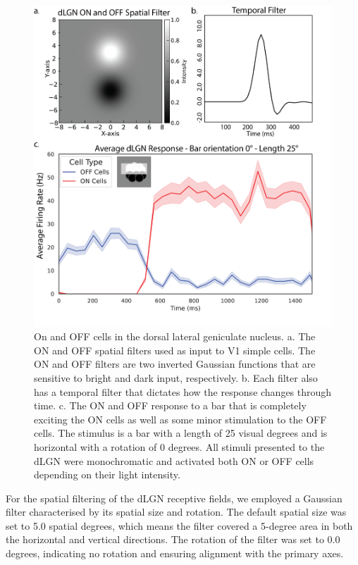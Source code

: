 \documentclass[12pt]{article}
\begin{document}
\begin{figure}[H]
  \centering
  \includegraphics[width=1.0 \textwidth]{adjusted_figures/lgn_response_fig.png}
  \caption{On and OFF cells in the dorsal lateral geniculate nucleus. a. The ON and OFF spatial filters used as input to V1 simple cells. The ON and OFF filters are two inverted Gaussian functions that are sensitive to bright and dark input, respectively. b. Each filter also has a temporal filter that dictates how the response changes through time. c. The ON and OFF response to a bar that is completely exciting the ON cells as well as some minor stimulation to the OFF cells. The stimulus is a bar with a length of 25 visual degrees and is horizontal with a rotation of 0 degrees. All stimuli presented to the dLGN were monochromatic and activated both ON or OFF cells depending on their light intensity.}
  \label{fig:LIF_connectivity}
\end{figure}

For the spatial filtering of the dLGN receptive fields, we employed a Gaussian filter characterised by its spatial size and rotation. The default spatial size was set to 5.0 spatial degrees, which means the filter covered a 5-degree area in both the horizontal and vertical directions. The rotation of the filter was set to 0.0 degrees, indicating no rotation and ensuring alignment with the primary axes.
\end{document}

